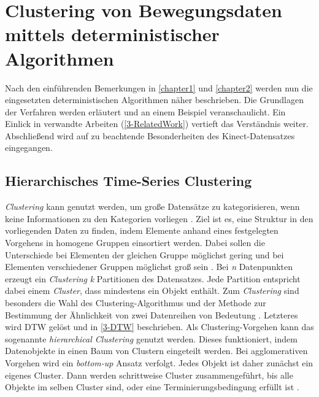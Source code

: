 \chapter{Clustering von Bewegungsdaten mittels deterministischer Algorithmen}
\label{chapter3}

Nach den einführenden Bemerkungen in \autoref{chapter1} und \autoref{chapter2} werden nun
die eingesetzten deterministischen Algorithmen näher beschrieben.
Die Grundlagen der Verfahren werden erläutert und an einem Beispiel veranschaulicht.
Ein Einlick in verwandte Arbeiten (\autoref{3-RelatedWork}) vertieft das Verständnis weiter.
Abschließend wird auf zu beachtende Besonderheiten des Kinect-Datensatzes eingegangen.


\section{Hierarchisches Time-Series Clustering}
\label{3-Clustering}
\emph{Clustering} kann genutzt werden, um große Datensätze zu kategorisieren,
wenn keine Informationen zu den Kategorien vorliegen \citep{aghabozorgi_time-series_2015}.
Ziel ist es, eine Struktur in den vorliegenden Daten zu finden,
indem Elemente anhand eines festgelegten Vorgehens in homogene Gruppen einsortiert werden.
Dabei sollen die Unterschiede bei Elementen der gleichen Gruppe möglichst gering
und bei Elementen verschiedener Gruppen möglichst groß sein \citep{aghabozorgi_time-series_2015, warren_liao_clustering_2005}.
Bei \emph{n} Datenpunkten erzeugt ein \emph{Clustering} \emph{k} Partitionen des Datensatzes.
Jede Partition entspricht dabei einem \emph{Cluster}, dass mindestens ein Objekt enthält.
Zum \emph{Clustering} sind besonders die Wahl des Clustering-Algorithmus
und der Methode zur Bestimmung der Ähnlichkeit von zwei Datenreihen von Bedeutung \citep{warren_liao_clustering_2005}.
Letzteres wird \ac{DTW} gelöst und in \autoref{3-DTW} beschrieben.
Als Clustering-Vorgehen kann das sogenannte \emph{hierarchical Clustering} genutzt werden.
Dieses funktioniert, indem Datenobjekte in einen Baum von Clustern eingeteilt werden.
Bei agglomerativen Vorgehen wird ein \emph{bottom-up} Ansatz verfolgt.
Jedes Objekt ist daher zunächst ein eigenes Cluster.
Dann werden schrittweise Cluster zusammengeführt,
bis alle Objekte im selben Cluster sind, oder eine Terminierungsbedingung erfüllt ist \citep{warren_liao_clustering_2005}.

